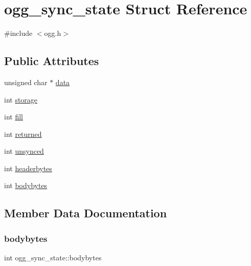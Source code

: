\hypertarget{structogg__sync__state}{}\section{ogg\+\_\+sync\+\_\+state Struct Reference}
\label{structogg__sync__state}


{\ttfamily \#include $<$ogg.\+h$>$}

\subsection*{Public Attributes}
\begin{DoxyCompactItemize}
\item 
unsigned char $\ast$ \mbox{\hyperlink{structogg__sync__state_adfc3f5d5a6434a582205ece0327fcc7d}{data}}
\item 
int \mbox{\hyperlink{structogg__sync__state_a15fc1bb5161fc4ae87b7a65982776c24}{storage}}
\item 
int \mbox{\hyperlink{structogg__sync__state_a3afef65cd358eab5827304b8c2360c7f}{fill}}
\item 
int \mbox{\hyperlink{structogg__sync__state_ac1b56ee81f71737f2f6397907f55a2e9}{returned}}
\item 
int \mbox{\hyperlink{structogg__sync__state_a8d538bb32400470f00080e2160158a76}{unsynced}}
\item 
int \mbox{\hyperlink{structogg__sync__state_abb64d78f386bc413527df838f2f681d5}{headerbytes}}
\item 
int \mbox{\hyperlink{structogg__sync__state_aa7ea6e81b751baaa04e4b49cb04e8317}{bodybytes}}
\end{DoxyCompactItemize}


\subsection{Member Data Documentation}
\mbox{\label{structogg__sync__state_aa7ea6e81b751baaa04e4b49cb04e8317}} 
\subsubsection{\texorpdfstring{bodybytes}{bodybytes}}
{\footnotesize\ttfamily int ogg\+\_\+sync\+\_\+state\+::bodybytes}

